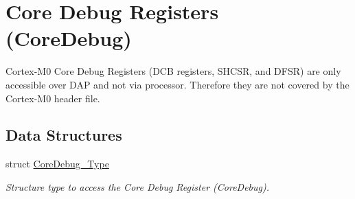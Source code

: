 \hypertarget{group___c_m_s_i_s___core_debug}{}\section{Core Debug Registers (Core\+Debug)}
\label{group___c_m_s_i_s___core_debug}


Cortex-\/\+M0 Core Debug Registers (D\+CB registers, S\+H\+C\+SR, and D\+F\+SR) are only accessible over D\+AP and not via processor. Therefore they are not covered by the Cortex-\/\+M0 header file.  


\subsection*{Data Structures}
\begin{DoxyCompactItemize}
\item 
struct \mbox{\hyperlink{struct_core_debug___type}{Core\+Debug\+\_\+\+Type}}
\begin{DoxyCompactList}\small\item\em Structure type to access the Core Debug Register (Core\+Debug). \end{DoxyCompactList}\end{DoxyCompactItemize}
